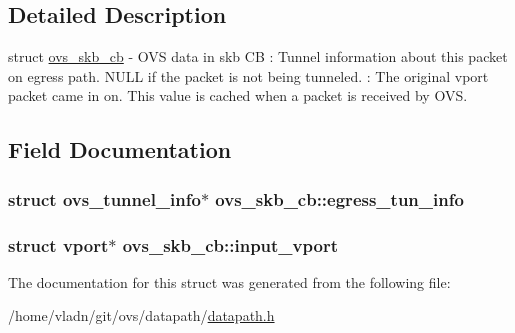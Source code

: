 \subsection{Detailed Description}
struct \hyperlink{structovs__skb__cb}{ovs\+\_\+skb\+\_\+cb} -\/ O\+V\+S data in skb C\+B \+: Tunnel information about this packet on egress path. N\+U\+L\+L if the packet is not being tunneled. \+: The original vport packet came in on. This value is cached when a packet is received by O\+V\+S. 

\subsection{Field Documentation}
\hypertarget{structovs__skb__cb_a077a089def65a6abde4e8f897591f2dc}{}
\subsubsection[{egress\+\_\+tun\+\_\+info}]{\setlength{\rightskip}{0pt plus 5cm}struct {\bf ovs\+\_\+tunnel\+\_\+info}$\ast$ ovs\+\_\+skb\+\_\+cb\+::egress\+\_\+tun\+\_\+info}\label{structovs__skb__cb_a077a089def65a6abde4e8f897591f2dc}
\hypertarget{structovs__skb__cb_a919a555392390f60eb84d1f46982744c}{}
\subsubsection[{input\+\_\+vport}]{\setlength{\rightskip}{0pt plus 5cm}struct {\bf vport}$\ast$ ovs\+\_\+skb\+\_\+cb\+::input\+\_\+vport}\label{structovs__skb__cb_a919a555392390f60eb84d1f46982744c}


The documentation for this struct was generated from the following file\+:\begin{DoxyCompactItemize}
\item 
/home/vladn/git/ovs/datapath/\hyperlink{datapath_8h}{datapath.\+h}\end{DoxyCompactItemize}
